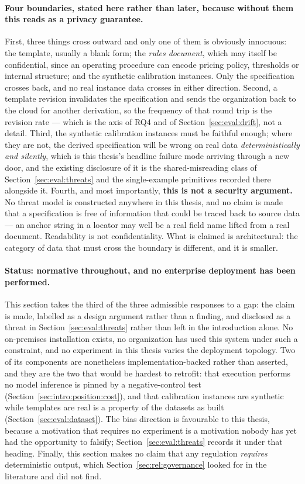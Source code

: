 \paragraph{Four boundaries, stated here rather than later, because without them this reads as a
privacy guarantee.}
First, three things cross outward and only one of them is obviously innocuous: the template,
usually a blank form; the \emph{rules document}, which may itself be confidential, since an
operating procedure can encode pricing policy, thresholds or internal structure; and the
synthetic calibration instances. Only the specification crosses back, and no real instance data
crosses in either direction. Second, a template revision invalidates the specification and
sends the organization back to the cloud for another derivation, so the frequency of that round
trip is the revision rate --- which is the axis of RQ4 and of Section~\ref{sec:eval:drift},
not a detail. Third, the synthetic calibration instances must be faithful enough; where they
are not, the derived specification will be wrong on real data \emph{deterministically and
silently}, which is this thesis's headline failure mode arriving through a new door, and the
existing disclosure of it is the shared-misreading class of Section~\ref{sec:eval:threats} and
the single-example primitives recorded there alongside it. Fourth, and most
importantly, \textbf{this is not a security argument.} No threat model is constructed anywhere
in this thesis, and no claim is made that a specification is free of information that could be
traced back to source data --- an anchor string in a locator may well be a real field name
lifted from a real document. Readability is not confidentiality. What is claimed is
architectural: the category of data that must cross the boundary is different, and it is
smaller.

\paragraph{Status: normative throughout, and no enterprise deployment has been performed.}
This section takes the third of the three admissible responses to a gap: the claim is made,
labelled as a design argument rather than a finding, and disclosed as a threat in
Section~\ref{sec:eval:threats} rather than left in the introduction alone. No on-premises
installation exists, no organization has used this system under such a constraint, and no
experiment in this thesis varies the deployment topology. Two of its components are
nonetheless implementation-backed rather than asserted, and they are the two that would be
hardest to retrofit: that execution performs no model inference is pinned by a negative-control
test (Section~\ref{sec:intro:position:cost}), and that calibration instances are synthetic
while templates are real is a property of the datasets as built
(Section~\ref{sec:eval:dataset}). The bias direction is favourable to this thesis, because a
motivation that requires no experiment is a motivation nobody has yet had the opportunity to
falsify; Section~\ref{sec:eval:threats} records it under that heading. Finally, this section
makes no claim that any regulation \emph{requires} deterministic output, which
Section~\ref{sec:rel:governance} looked for in the literature and did not find.

